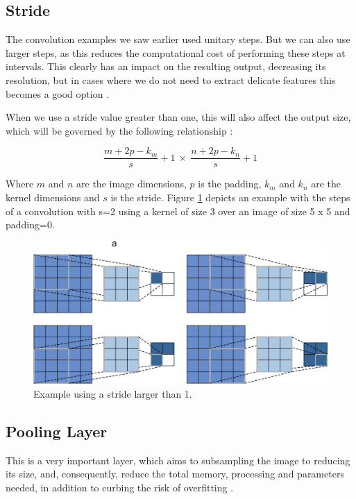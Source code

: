 \subsection{Stride}

The convolution examples we saw earlier used unitary steps. But we can also use larger steps, as this reduces the computational cost of performing these steps at intervals. This clearly has an impact on the resulting output, decreasing its resolution, but in cases where we do not need to extract delicate features this becomes a good option \cite{goodfellow2016}.

When we use a stride value greater than one, this will also affect the output size, which will be governed by the following relationship \cite{adrian2017}:

\begin{equation}
\frac{m+2p-k_m}{s}+1 \  \times \ \frac{n+2p-k_n}{s}+1
\end{equation}

Where $m$ and $n$ are the image dimensions, $p$ is the padding, $k_m$ and $k_n$ are the kernel dimensions and $s$ is the stride. Figure \ref{fig:stride} depicts an example with the steps of a convolution with s=2 using a kernel of size 3 over an image of size 5 x 5 and padding=0.

\begin{figure}
    \centering
    \includegraphics[scale=0.20]{images/stride.png}
    \caption{Example using a stride larger than 1.}
    \label{fig:stride}
\end{figure}

\subsection{Pooling Layer}

This is a very important layer, which aims to subsampling the image to reducing its size, and, consequently, reduce the total memory, processing and parameters needed, in addition to curbing the risk of overfitting \cite{geron2019}\cite{adrian2017}\cite{elgendy2020}.

